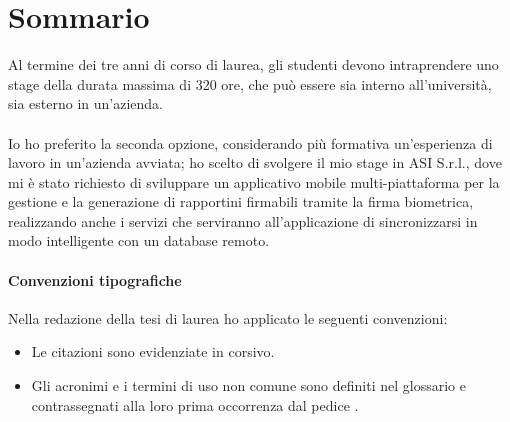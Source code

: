 \cleardoublepage
{}
{}
\begingroup
\let\clearpage\relax
\let\cleardoublepage\relax
\let\cleardoublepage\relax

\chapter*{Sommario}
Al termine dei tre anni di corso di laurea, gli studenti devono intraprendere uno stage della durata massima di 320 ore, che può essere sia interno all'università, sia esterno in un'azienda.
\\
\\
Io ho preferito la seconda opzione, considerando più formativa un'esperienza di lavoro in un'azienda avviata; ho scelto di svolgere il mio stage in ASI S.r.l., dove mi è stato richiesto di sviluppare un applicativo mobile multi-piattaforma per la gestione e la generazione di rapportini firmabili tramite la firma biometrica, realizzando anche i servizi che serviranno all'applicazione di sincronizzarsi in modo intelligente con un database remoto.

\subsubsection*{Convenzioni tipografiche}
Nella redazione della tesi di laurea ho applicato le seguenti convenzioni:
\begin{itemize}
	\item Le citazioni sono evidenziate in corsivo.
	\item Gli acronimi e i termini di uso non comune sono definiti nel glossario e contrassegnati alla loro prima occorrenza dal pedice . 
\end{itemize} 


%
%

\endgroup			

\vfill

